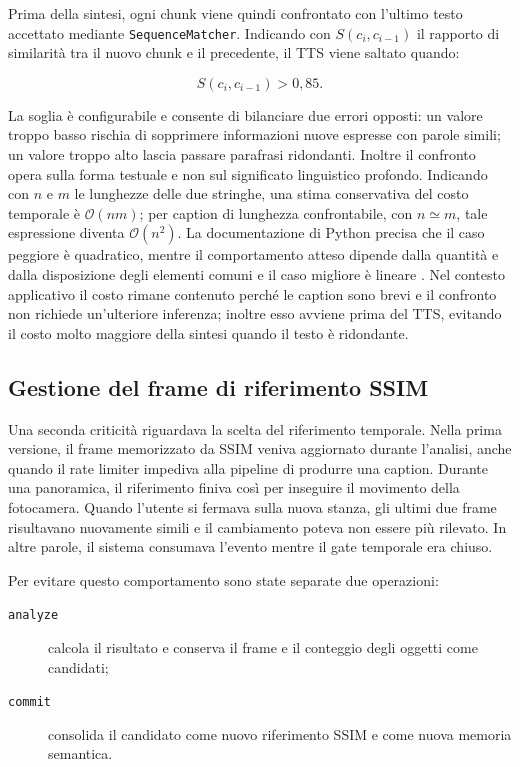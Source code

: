 Prima della sintesi, ogni chunk viene quindi confrontato con l'ultimo testo
accettato mediante \texttt{SequenceMatcher}. Indicando con \(S(c_i,c_{i-1})\)
il rapporto di similarità tra il nuovo chunk e il precedente, il TTS viene
saltato quando:

\begin{equation}
    S(c_i,c_{i-1}) > 0{,}85.
    \label{eq:caption-dedup}
\end{equation}

La soglia è configurabile e consente di bilanciare due errori opposti: un
valore troppo basso rischia di sopprimere informazioni nuove espresse con
parole simili; un valore troppo alto lascia passare parafrasi ridondanti.
Inoltre il confronto opera sulla forma testuale e non sul significato
linguistico profondo. Indicando con \(n\) e \(m\) le lunghezze delle due
stringhe, una stima conservativa del costo temporale è
\(\mathcal{O}(nm)\); per caption di lunghezza confrontabile, con
\(n \simeq m\), tale espressione diventa \(\mathcal{O}(n^2)\). La
documentazione di Python precisa che il caso peggiore è quadratico, mentre il
comportamento atteso dipende dalla quantità e dalla disposizione degli
elementi comuni e il caso migliore è lineare
\cite{python314difflib}. Nel contesto applicativo il costo rimane contenuto
perché le caption sono brevi e il confronto non richiede un'ulteriore
inferenza; inoltre esso avviene prima del TTS, evitando il costo molto
maggiore della sintesi quando il testo è ridondante.

\subsection{Gestione del frame di riferimento SSIM}
\label{subsec:problemi-keyframe}

Una seconda criticità riguardava la scelta del riferimento temporale. Nella
prima versione, il frame memorizzato da SSIM veniva aggiornato durante
l'analisi, anche quando il rate limiter impediva alla pipeline di produrre una
caption. Durante una panoramica, il riferimento finiva così per inseguire il
movimento della fotocamera. Quando l'utente si fermava sulla nuova stanza, gli
ultimi due frame risultavano nuovamente simili e il cambiamento poteva non
essere più rilevato. In altre parole, il sistema consumava l'evento mentre il
gate temporale era chiuso.

Per evitare questo comportamento sono state separate due operazioni:

\begin{description}
    \item[\texttt{analyze}] calcola il risultato e conserva il frame e il
    conteggio degli oggetti come candidati;
    \item[\texttt{commit}] consolida il candidato come nuovo riferimento SSIM
    e come nuova memoria semantica.
\end{description}


